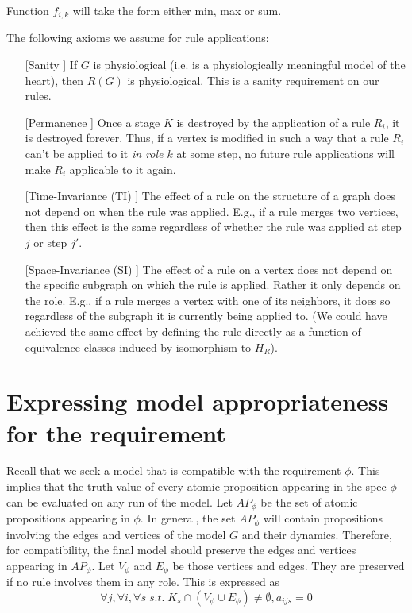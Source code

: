 \documentclass[11pt, oneside, reqno]{article}
\begin{document}
Function $f_{i,k}$ will take the form either min, max or sum.

The following axioms we assume for rule applications:
\begin{enumerate}
	\item [[Sanity]] If $G$ is physiological (i.e. is a physiologically meaningful model of the heart), then $R(G)$ is physiological. This is a sanity requirement on our rules.
	\label{axiomSanity}
	\item [[Permanence]] Once a stage $K$ is destroyed by the application of a rule $R_i$, it is destroyed forever.
	Thus, if a vertex is modified in such a way that a rule $R_i$ can't be applied to it \emph{in role $k$} at some step, no future rule applications will make $R_i$ applicable to it again.
	\label{axiomPermanence}
	\item [[Time-Invariance (TI)]] The effect of a rule on the structure of a graph does not depend on when the rule was applied.
	E.g., if a rule merges two vertices, then this effect is the same regardless of whether the rule was applied at step $j$ or step $j'$.
	\label{axiomTI}
	\item [[Space-Invariance (SI)]] The effect of a rule on a vertex does not depend on the specific subgraph on which the rule is applied. 
	Rather it only depends on the role.
	E.g., if a rule merges a vertex with one of its neighbors, it does so regardless of the subgraph it is currently being applied to. 
	(We could have achieved the same effect by defining the rule directly as a function of equivalence classes induced by isomorphism to $H_R$).
	\label{axiomSI}
\end{enumerate}

\section{Expressing model appropriateness for the requirement}

Recall that we seek a model that is compatible with the requirement $\phi$.
This implies that the truth value of every atomic proposition appearing in the spec $\phi$ can be evaluated on any run of the model.
Let $AP_\phi$ be the set of atomic propositions appearing in $\phi$.
In general, the set $AP_\phi$ will contain propositions involving the edges and vertices of the model $G$ and their dynamics. 
Therefore, for compatibility, the final model should preserve the edges and vertices appearing in $AP_\phi$. 
Let $V_\phi$ and $E_\phi$ be those vertices and edges.
They are preserved if no rule involves them in any role.
This is expressed as
\begin{equation}
\label{eq:Vphi}
\forall j, \forall i, \forall s \; s.t. \; K_s \cap (V_\phi \cup E_\phi)\neq \emptyset, a_{ijs}=0
\end{equation}
\end{document}
